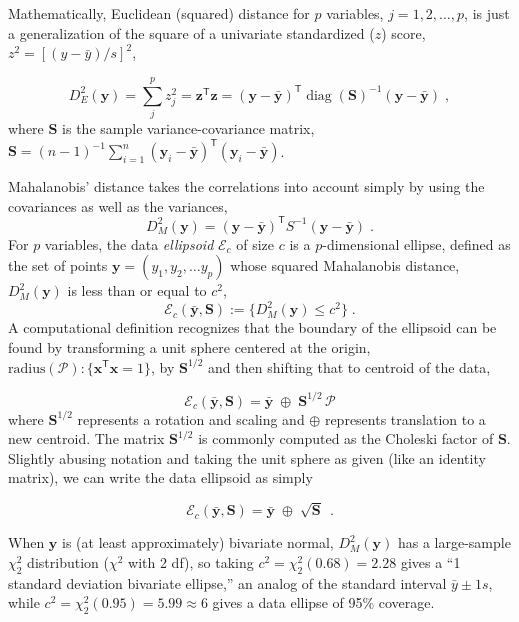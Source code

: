 \documentclass[
  letterpaper,
  10pt,
  krantz2]{krantz}
\begin{document}
Mathematically, Euclidean (squared) distance for \(p\) variables,
\(j = 1, 2, \dots , p\), is just a generalization of the square of a
univariate standardized (\(z\)) score, \(z^2 = [(y - \bar{y}) / s]^2\),

\[
D_E^2 (\mathbf{y}) = \sum_j^p z_j^2 = \mathbf{z}^\textsf{T}  \mathbf{z} = (\mathbf{y} - \bar{\mathbf{y}})^\textsf{T} \operatorname{diag}(\mathbf{S})^{-1} (\mathbf{y} - \bar{\mathbf{y}}) \; ,
\] where \(\mathbf{S}\) is the sample variance-covariance matrix,
\(\mathbf{S} = ({n-1})^{-1} \sum_{i=1}^n (\mathbf{y}_i - \bar{\mathbf{y}})^\textsf{T} (\mathbf{y}_i - \bar{\mathbf{y}})\).

Mahalanobis' distance takes the correlations into account simply by
using the covariances as well as the variances, \[
D_M^2 (\mathbf{y}) = (\mathbf{y} - \bar{\mathbf{y}})^\textsf{T} S^{-1} (\mathbf{y} - \bar{\mathbf{y}}) \; .
\] For \(p\) variables, the data \emph{ellipsoid} \(\mathcal{E}_c\) of
size \(c\) is a \(p\)-dimensional ellipse, defined as the set of points
\(\mathbf{y} = (y_1, y_2, \dots y_p)\) whose squared Mahalanobis
distance, \(D_M^2 ( \mathbf{y} )\) is less than or equal to \(c^2\), \[
\mathcal{E}_c (\bar{\mathbf{y}}, \mathbf{S}) := \{ D_M^2 (\mathbf{y}) \le c^2 \} \; .
\] A computational definition recognizes that the boundary of the
ellipsoid can be found by transforming a unit sphere centered at the
origin,
\(\text{radius}(\mathcal{P}) : \{ \mathbf{x}^\textsf{T} \mathbf{x}= 1\}\),
by \(\mathbf{S}^{1/2}\) and then shifting that to centroid of the data,

\[
\mathcal{E}_c (\bar{\mathbf{y}}, \mathbf{S}) = \bar{\mathbf{y}} \; \oplus \; \mathbf{S}^{1/2} \, \mathcal{P} 
\] where \(\mathbf{S}^{1/2}\) represents a rotation and scaling and
\(\oplus\) represents translation to a new centroid. The matrix
\(\mathbf{S}^{1/2}\) is commonly computed as the Choleski factor of
\(\mathbf{S}\). Slightly abusing notation and taking the unit sphere as
given (like an identity matrix), we can write the data ellipsoid as
simply

\[
\mathcal{E}_c (\bar{\mathbf{y}}, \mathbf{S}) = \bar{\mathbf{y}} \; \oplus \; \sqrt{\mathbf{S}} \:\: .
\]

When \(\mathbf{y}\) is (at least approximately) bivariate normal,
\(D_M^2(\mathbf{y})\) has a large-sample \(\chi^2_2\) distribution
(\(\chi^2\) with 2 df), so taking \(c^2 = \chi^2_2 (0.68) = 2.28\) gives
a ``1 standard deviation bivariate ellipse,'' an analog of the standard
interval \(\bar{y} \pm 1 s\), while
\(c^2 = \chi^2_2 (0.95) = 5.99 \approx 6\) gives a data ellipse of 95\%
coverage.
\end{document}
